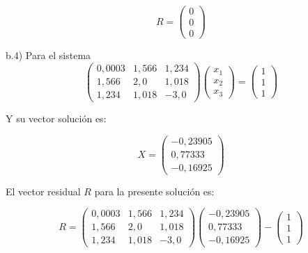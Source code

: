 \begin{equation*}
    R=
    \begin{pmatrix}
        0 \\
        0 \\
        0
    \end{pmatrix}
\end{equation*}

b.4) Para el sistema
\begin{equation*}
    \begin{pmatrix}
        0,0003 & 1,566 & 1,234 \\
        1,566 & 2,0 & 1,018 \\
        1,234 & 1,018 & -3,0
    \end{pmatrix}
    \begin{pmatrix}
        x_1 \\
        x_2 \\
        x_3
    \end{pmatrix}    
    =    
    \begin{pmatrix}
        1 \\
        1 \\
        1
    \end{pmatrix}
\end{equation*}

Y su vector solución es:

\begin{equation*}
    X=
    \begin{pmatrix}
        -0,23905 \\
        0,77333 \\
        -0,16925
    \end{pmatrix}    
\end{equation*}

El vector residual $R$ para la presente solución es:

\begin{equation*}
    R=
    \begin{pmatrix}
        0,0003 & 1,566 & 1,234 \\
        1,566 & 2,0 & 1,018 \\
        1,234 & 1,018 & -3,0
    \end{pmatrix}
    \begin{pmatrix}
        -0,23905 \\
        0,77333 \\
        -0,16925
    \end{pmatrix}    
    -   
    \begin{pmatrix}
        1 \\
        1 \\
        1
    \end{pmatrix}
\end{equation*}

